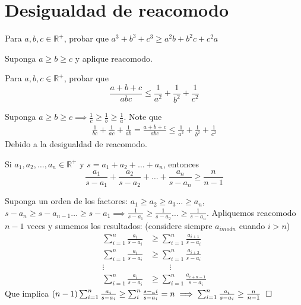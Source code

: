 \section{Desigualdad de reacomodo}

\begin{ejer}
	Para $a,b,c \in \mathbb{R}^{+}$, probar que $a^3+b^3+c^3\geq a^2 b+b^2 c+c^2 a$
\end{ejer}
\begin{sol}
	Suponga $a\geq b\geq c $ y aplique reacomodo.
\end{sol}

\begin{ejer}
	Para $a,b,c\in\mathbb{R}^{+}$, probar que
	\begin{equation}
	\frac{a+b+c}{abc} \leq \frac{1}{a^{2}} + \frac{1}{b^{2}}  + \frac{1}{c^{2}} 
	\end{equation}	
\end{ejer}
\begin{sol}
	Suponga $a\geq b\geq c \implies \frac{1}{c} \geq \frac{1}{b} \geq \frac{1}{a}$. Note que
	\begin{align}
	\frac{1}{bc} + \frac{1}{ac} + \frac{1}{ab} = \frac{a+b+c}{abc} \leq \frac{1}{a^2} + \frac{1}{b^2} + \frac{1}{c^2}
	\end{align}
	Debido a la desigualdad de reacomodo.
\end{sol}

\begin{ejer}
	Si $a_{1},a_{2},…,a_{n}\in \mathbb{R}^{+}$ y $s=a_{1}+a_{2}+ \dots +a_{n}$, entonces
	\begin{equation}
	    \frac{a_{1}}{s-a_{1}} + \frac{a_{2}}{s-a_{2}} + \dots + \frac{a_{n}}{s-a_{n}} \geq \frac{n}{n-1}
	\end{equation}
\end{ejer}
\begin{sol}
	Suponga un orden de los factores: $a_{1} \geq a_{2} \geq a_{3} \dots  \geq a_{n}$,  $s-a_{n} \geq s-a_{n-1} \dots  \geq s-a_{1} \implies \frac{1}{s-a_{1}} \geq \frac{1}{s-a_{2}} \dots \geq \frac{1}{s-a_{n}}$. Apliquemos reacomodo $n-1$ veces y sumemos los resultados: (considere siempre $a_{i mod n}$ cuando $i>n$)
	\begin{align}
	\sum_{i=1}^{n} \frac{a_{i}}{s-a_{i}} &\geq  \sum_{i=1}^{n} \frac{a_{i+1}}{s-a_{i}} \\
	\sum_{i=1}^{n} \frac{a_{i}}{s-a_{i}} &\geq  \sum_{i=1}^{n} \frac{a_{i+2}}{s-a_{i}} \\
	\vdots \hspace{1cm}&\hspace{1cm} \vdots \\
	\sum_{i=1}^{n} \frac{a_{i}}{s-a_{i}} &\geq  \sum_{i=1}^{n} \frac{a_{i+n-1}}{s-a_{i}}
	\end{align}
	Que implica $(n-1)\sum_{i=1}^{n} \frac{a_{i}}{s-a_{i}} \geq \sum_{i}^{n} \frac{s-_a{i}}{s-a_{i}} = n \implies \sum_{i=1}^{n} \frac{a_{i}}{s-a_{i}} \geq \frac{n}{n-1}\hspace{0.2cm}\square$
\end{sol}

